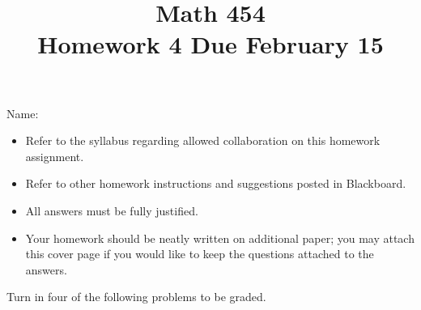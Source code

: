 \documentclass[11pt]{amsart}
\begin{document}
\title{Math 454\\ Homework 4 \qquad Due February 15}
\author{}
\date{}
\maketitle
\thispagestyle{empty}

\noindent Name:~\hrulefill~~\\

\begin{itemize}
\item Refer to the syllabus regarding allowed collaboration on this homework assignment.
\item Refer to other homework instructions and suggestions posted in Blackboard.
\item All answers must be fully justified.
\item Your homework should be neatly written on additional paper; you may attach this cover page if you would like to keep the questions attached to the answers.
\end{itemize}

\bigskip

Turn in four of the following problems to be graded.

\bigskip
\end{document}
